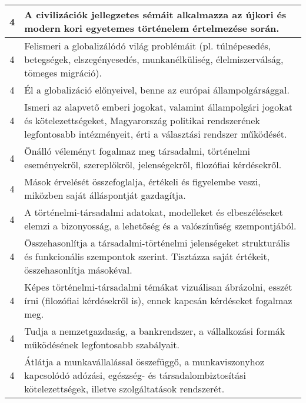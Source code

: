 \begin{longtable}{c | p{12cm} }
                                          4 &  A civilizációk jellegzetes sémáit alkalmazza az újkori és modern kori egyetemes történelem értelmezése során. \\ \hline
                                          4 &  Felismeri a globalizálódó világ problémáit (pl. túlnépesedés, betegségek, elszegényesedés, munkanélküliség, élelmiszerválság, tömeges migráció). \\ \hline
                                          4 &  Él a globalizáció előnyeivel, benne az európai állampolgársággal. \\ \hline
                                          4 &  Ismeri az alapvető emberi jogokat, valamint állampolgári jogokat és kötelezettségeket, Magyarország politikai rendszerének legfontosabb intézményeit, érti a választási rendszer működését. \\ \hline
                                          4 &  Önálló véleményt fogalmaz meg társadalmi, történelmi eseményekről, szereplőkről, jelenségekről, filozófiai kérdésekről. \\ \hline
                                          4 &  Mások érvelését összefoglalja, értékeli és figyelembe veszi, miközben saját álláspontját gazdagítja. \\ \hline
                                          4 &  A történelmi-társadalmi adatokat, modelleket és elbeszéléseket elemzi a bizonyosság, a lehetőség és a valószínűség szempontjából. \\ \hline
                                          4 &  Összehasonlítja a társadalmi-történelmi jelenségeket strukturális és funkcionális szempontok szerint. Tisztázza saját értékeit, összehasonlítja másokéval. \\ \hline
                                          4 &  Képes történelmi-társadalmi témákat vizuálisan ábrázolni, esszét írni (filozófiai kérdésekről is), ennek kapcsán kérdéseket fogalmaz meg. \\ \hline
                                          4 &  Tudja a nemzetgazdaság, a bankrendszer, a vállalkozási formák működésének legfontosabb szabályait. \\ \hline
                                          4 &  Átlátja a munkavállalással összefüggő, a munkaviszonyhoz kapcsolódó adózási, egészség- és társadalombiztosítási kötelezettségek, illetve szolgáltatások rendszerét. \\ \hline
                                      
                        \end{longtable}
            \clearpage

